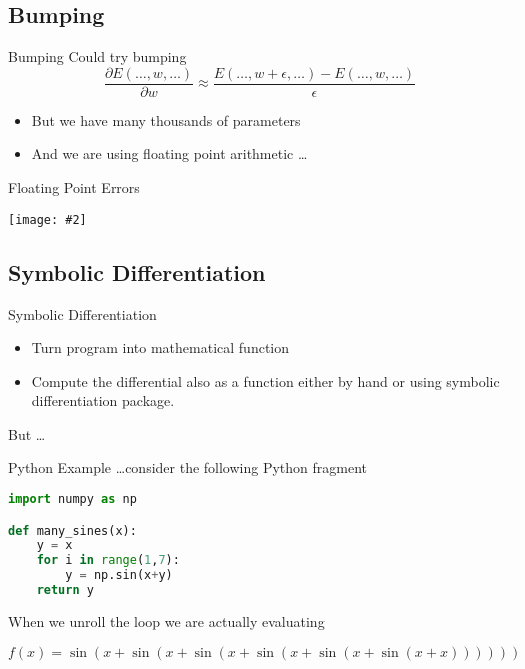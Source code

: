 \documentclass{beamer}
\newcommand {\framedgraphic}[2] {
    \begin{frame}{#1}
        \begin{center}
            \texttt{[image: \#2]}
        \end{center}
    \end{frame}
}
\begin{document}
\subsection{Bumping}

\begin{frame}{Bumping}
Could try bumping
$$
\frac{\partial E(\ldots, w, \ldots)}{\partial w} \approx \frac{E(\ldots, w + \epsilon, \ldots) - E(\ldots, w, \ldots)}{\epsilon}
$$
\begin{itemize}
\item
But we have many thousands of parameters
\item
And we are using floating point arithmetic \ldots
\end{itemize}
\end{frame}

\framedgraphic{Floating Point Errors}{diagrams/13a2bd186a0e123f040da9491fa98684.png}

\subsection{Symbolic Differentiation}
\begin{frame}[fragile]{Symbolic Differentiation}
\begin{itemize}
\item
Turn program into mathematical function
\item
Compute the differential also as a function either by hand or using
symbolic differentiation package.
\end{itemize}

But \ldots
\end{frame}

\begin{frame}[fragile]{Python Example}
\ldots consider the following Python fragment
\begin{lstlisting}[language=Python]
import numpy as np

def many_sines(x):
    y = x
    for i in range(1,7):
        y = np.sin(x+y)
    return y
\end{lstlisting}

When we unroll the loop we are actually evaluating

$$
f(x) = \sin(x + \sin(x + \sin(x + \sin(x + \sin(x + \sin(x + x))))))
$$

\end{frame}
\end{document}
